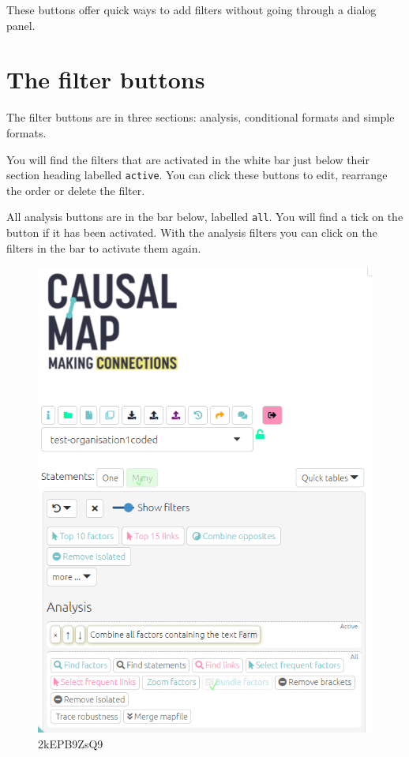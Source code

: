 \documentclass[
]{book}
\begin{document}
These buttons offer quick ways to add filters without going through a dialog panel.

\hypertarget{the-filter-buttons-1}{%
\section{The filter buttons}\label{the-filter-buttons-1}}

The filter buttons are in three sections: analysis, conditional formats and simple formats.

You will find the filters that are activated in the white bar just below their section heading labelled \texttt{active}. You can click these buttons to edit, rearrange the order or delete the filter.

All analysis buttons are in the bar below, labelled \texttt{all}. You will find a tick on the button if it has been activated. With the analysis filters you can click on the filters in the bar to activate them again.

\begin{figure}
\centering
\includegraphics[width=6.77083in,height=\textheight]{_assets/2kEPB9ZsQ9-16375962552001.gif}
\caption{2kEPB9ZsQ9}
\end{figure}
\end{document}
